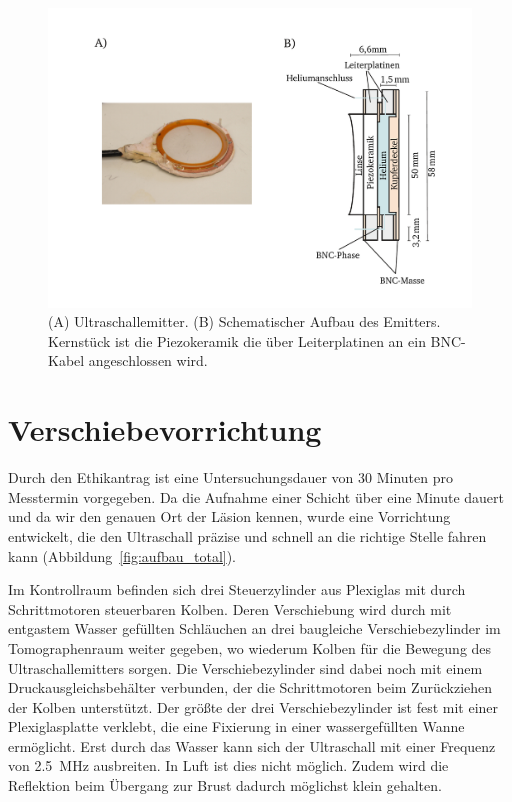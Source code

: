 \documentclass[
    11pt,
    ngerman
]{scrreprt}
\begin{document}
\begin{figure}
    \centering
    \includegraphics[width=.8\textwidth]{Abbildungen/emitter.pdf}
    \caption{(A) Ultraschallemitter. (B) Schematischer Aufbau des Emitters. Kernstück ist die Piezokeramik die über Leiterplatinen an ein BNC-Kabel angeschlossen wird.}
    \label{fig:emitter}
\end{figure}

\section{Verschiebevorrichtung}

Durch den Ethikantrag ist eine Untersuchungsdauer von 30 Minuten pro Messtermin
vorgegeben. Da die Aufnahme einer Schicht über eine Minute dauert und da wir
den genauen Ort der Läsion kennen, wurde eine Vorrichtung entwickelt, die den
Ultraschall präzise und schnell an die richtige Stelle fahren kann
(Abbildung~\ref{fig:aufbau_total}).

Im Kontrollraum befinden sich drei Steuerzylinder aus Plexiglas mit durch
Schrittmotoren steuerbaren Kolben. Deren Verschiebung wird durch mit
entgastem Wasser gefüllten Schläuchen an drei baugleiche Verschiebezylinder im
Tomographenraum weiter gegeben, wo wiederum Kolben für die Bewegung des
Ultraschallemitters sorgen. Die Verschiebezylinder sind dabei noch mit einem
Druckausgleichsbehälter verbunden, der die Schrittmotoren beim Zurückziehen der
Kolben unterstützt. Der größte der drei Verschiebezylinder ist fest mit einer
Plexiglasplatte verklebt, die eine Fixierung in einer wassergefüllten Wanne
ermöglicht. Erst durch das Wasser kann sich der Ultraschall mit einer Frequenz
von \SI{2.5}{\mega\hertz} ausbreiten. In Luft ist dies nicht möglich. Zudem wird
die Reflektion beim Übergang zur Brust dadurch möglichst klein gehalten.
\end{document}
